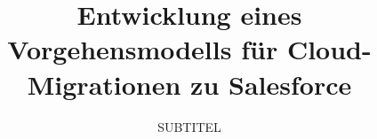 \title{Entwicklung eines Vorgehensmodells für Cloud-Migrationen zu Salesforce}

\subtitle{SUBTITEL}









